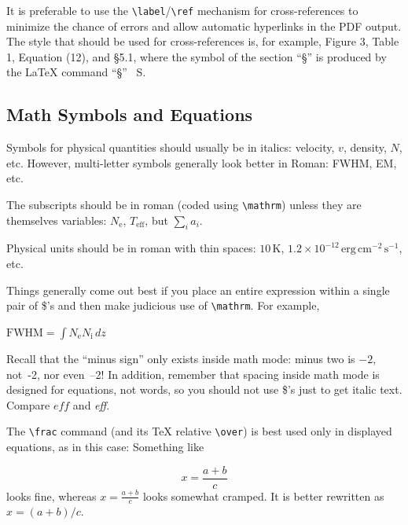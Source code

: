 \documentclass[9pt,article,twoside]{fapet-rho-class/fapet-rho}
\newcommand{\CS}[1]{\texttt{\textbackslash #1}}
\newenvironment{Example}
{\begin{list}{}{\setlength{\leftmargin}{10pt}\setlength{\rightmargin}{10pt}}%
  \item[]\itshape}
  {\end{list}}
\begin{document}
    It is preferable to use the \CS{label}/\CS{ref} mechanism for cross-references to minimize the chance of errors and allow automatic hyperlinks in the PDF output. The style that should be used for cross-references is, for example, Figure 3, Table 1, Equation (12), and \S 5.1, where the symbol of the section “§” is produced by the \LaTeX{} command “\S” \ S.

    \subsection{Math Symbols and Equations} \label{sec:math}

        Symbols for physical quantities should usually be in italics: velocity, $v$, density, $N$, etc. However, multi-letter symbols generally look better in Roman: FWHM, EM, etc. 
    
        The subscripts should be in roman (coded using \CS{mathrm}) unless they are themselves variables: $N_\mathrm{e}$, $T_\mathrm{eff}$, but $\sum_i a_i$. 
        
        Physical units should be in roman with thin spaces: $10\,\mathrm{K}$, $1.2\times10^{-12}\,\mathrm{erg\,cm^{-2}\,s^{-1}}$, etc. 
    
        Things generally come out best if you place an entire expression within a single pair of \$'s and then make judicious use of \CS{mathrm}. For example,
    
        \begin{Example}
          $ \mathrm{FWHM} = \int N_\mathrm{e} N_\mathrm{i} \, dz $ 
        \end{Example}
    
        Recall that the ``minus sign'' only exists inside math mode: minus two is $-2$, not~-2, nor \hbox{even --2!} In addition, remember that spacing inside math mode is designed for equations, not words, so you should not use \$'s just to get italic text. Compare $eff$ and \textit{eff}. 
    
        The \CS{frac} command (and its \TeX{} relative \CS{over}) is best used only in displayed equations, as in this case: Something like 
    
        \begin{equation} \label{ec:Equation1}
            x = \frac { a + b } { c } 
        \end{equation}
    looks fine, whereas $x = \frac { a + b } { c }$ looks somewhat cramped. It is better rewritten as $x = (a + b) / c $. 
    
\end{document}
